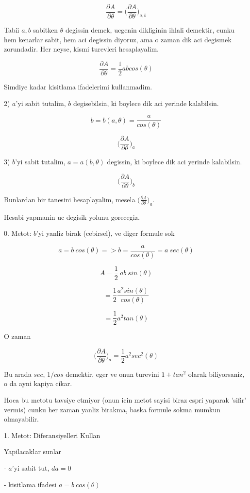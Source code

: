 \documentclass[12pt,fleqn]{article}\usepackage{../common}
\begin{document}
\[ \frac{\partial A}{\partial \theta} = 
\bigg( \frac{\partial A}{\partial \theta} \bigg)_{a,b}  \]

Tabii $a,b$ sabitken $\theta$ degissin demek, ucgenin dikliginin ihlali
demektir, cunku hem kenarlar sabit, hem aci degissin diyoruz, ama o zaman
dik aci degismek zorundadir. Her neyse, kismi turevleri hesaplayalim. 

\[ \frac{\partial A}{\partial \theta} = \frac{1}{2}ab cos(\theta) \]

Simdiye kadar kisitlama ifadelerimi kullanmadim. 

2) $a$'yi sabit tutalim, $b$ degisebilsin, ki boylece dik aci yerinde
kalabilsin. 

\[ b = b(a,\theta) = \frac{a}{cos(\theta)} \]

\[ \bigg( \frac{\partial A}{\partial \theta} \bigg)_{a}  \]

3) $b$'yi sabit tutalim, $a = a(b,\theta)$ degissin, ki boylece dik aci yerinde
kalabilsin. 

\[ \bigg( \frac{\partial A}{\partial \theta} \bigg)_{b}  \]

Bunlardan bir tanesini hesaplayalim, mesela $\bigg( \frac{\partial A}{\partial \theta} \bigg)_{a} $.

Hesabi yapmanin uc degisik yolunu gorecegiz. 

0. Metot: $b$'yi yanliz birak (cebirsel), ve diger formule sok

\[ a = b \ cos (\theta) => b = \frac{a}{cos(\theta)} = a \ sec (\theta)\]

\[ A = \frac{1}{2} \ ab \ sin(\theta) \]

\[ = \frac{1}{2} \frac{a^2 sin(\theta)}{cos(\theta)} \]

\[ = \frac{1}{2} a^2 tan(\theta) \]

O zaman 

\[ \bigg( \frac{\partial A}{\partial \theta} \bigg)_{a} = 
\frac{1}{2}a^2sec^2(\theta)
 \]

Bu arada $sec$, $1/cos$ demektir, eger ve onun turevini $1+tan^2$ olarak
biliyorsaniz, o da ayni kapiya cikar. 

Hoca bu metotu tavsiye etmiyor (onun icin metot sayisi biraz espri yaparak
'sifir' vermis) cunku her zaman yanliz birakma, baska formule sokma mumkun
olmayabilir.

1. Metot: Diferansiyelleri Kullan

Yapilacaklar sunlar

- $a$'yi sabit tut, $da = 0$

- kisitlama ifadesi $a = b \ cos(\theta)$
\end{document}
